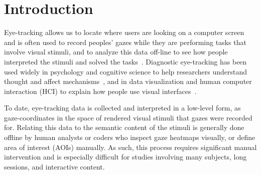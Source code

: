 \section{Introduction}

Eye-tracking allows us to locate where users are looking on a computer screen~\cite{ware1987evaluation,jacob1991use} and is often used to record peoples' gazes while they are performing tasks that involve visual stimuli, and to analyze this data off-line to see how people interpreted the stimuli and solved the tasks~\cite{duchowski2007eye}. Diagnostic eye-tracking has been used widely in psychology and cognitive science to help researchers understand thought and affect mechanisms~\cite{rayner1995eye}, and in data visualization and human computer interaction (HCI) to explain how people use visual interfaces~\cite{duchowski2007eye}. 

To date, eye-tracking data is collected and interpreted in a low-level form, as gaze-coordinates in the space of rendered visual stimuli that gazes were recorded for. Relating this data to the semantic content of the stimuli is generally done offline by human analysts or coders who inspect gaze heatmaps visually, or define area of interest (AOIs) manually. As such, this process requires significant manual intervention and is especially difficult for studies involving many subjects, long sessions, and interactive content.

